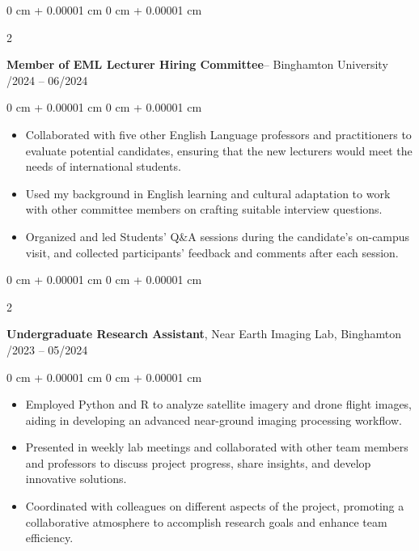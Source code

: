 \documentclass[10pt, letterpaper]{article}
\newenvironment{highlights}{
    \begin{itemize}[
        topsep=0.10 cm,
        parsep=0.10 cm,
        partopsep=0pt,
        itemsep=0pt,
        leftmargin=0 cm + 10pt
    ]
}{
    \end{itemize}
} %
\newenvironment{onecolentry}{
    \begin{adjustwidth}{
        0 cm + 0.00001 cm
    }{
        0 cm + 0.00001 cm
    }
}{
    \end{adjustwidth}
} %
\newenvironment{twocolentry}[2][]{
    \onecolentry
    \def\secondColumn{#2}
    \setcolumnwidth{\fill, 4.5 cm}
    \begin{paracol}{2}
}{
    \switchcolumn \raggedleft \secondColumn
    \end{paracol}
    \endonecolentry
} %
\begin{document}
        \vspace{0.2 cm}

        \begin{twocolentry}{
            01/2024 – 06/2024
        }
            \textbf{\textbf{Member of EML Lecturer Hiring Committee}}-- Binghamton University \end{twocolentry}

        \vspace{0.10 cm}
        \begin{onecolentry}
            \begin{highlights}
                \item Collaborated with five other English Language professors and practitioners to evaluate potential candidates, ensuring that the new lecturers would meet the needs of international students.
                \item Used my background in English learning and cultural adaptation to work with other committee members on crafting suitable interview questions.
                \item Organized and led Students’ Q\&A sessions during the candidate’s on-campus visit, and collected participants’ feedback and comments after each session.
            \end{highlights}
        \end{onecolentry}

        \vspace{0.2 cm}

        \begin{twocolentry}{
            09/2023 – 05/2024
        }
            \textbf{\textbf{\textbf{Undergraduate Research Assistant}}}, Near Earth Imaging Lab, Binghamton   \end{twocolentry}
        \vspace{0.10 cm}
        \begin{onecolentry}
            \begin{highlights}
                \item Employed Python and R to analyze satellite imagery and drone flight images, aiding in developing an advanced near-ground imaging processing workflow.
                \item Presented in weekly lab meetings and collaborated with other team members and professors to discuss project progress, share insights, and develop innovative solutions.
                \item Coordinated with colleagues on different aspects of the project, promoting a collaborative atmosphere to accomplish research goals and enhance team efficiency.
            \end{highlights}
        \end{onecolentry}
\end{document}
